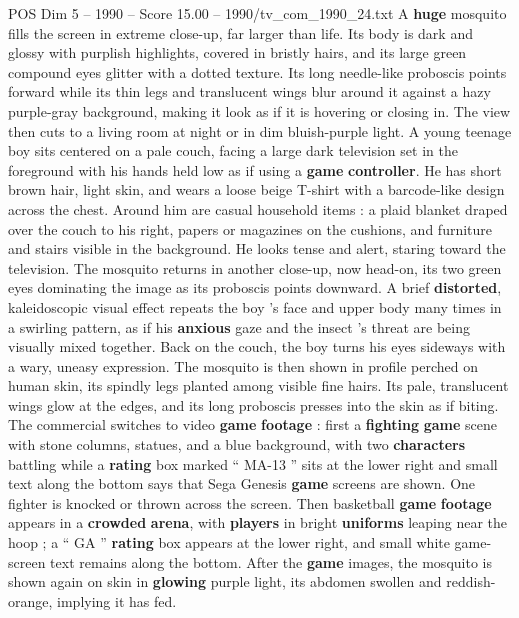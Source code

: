 \begin{textsample}{POS Dim 5 – 1990 – Score 15.00 – 1990/tv\_com\_1990\_24.txt}  \label{ex:f5_pos_005}
A \textbf{huge} mosquito fills the screen in extreme close-up, far larger than life.
Its body is dark and glossy with purplish highlights, covered in bristly hairs, and its large green compound eyes glitter with a dotted texture.
Its long needle-like proboscis points forward while its thin legs and translucent wings blur around it against a hazy purple-gray background, making it look as if it is hovering or closing in.
The view then cuts to a living room at night or in dim bluish-purple light.
A young teenage boy sits centered on a pale couch, facing a large dark television set in the foreground with his hands held low as if using a \textbf{game} \textbf{controller}.
He has short brown hair, light skin, and wears a loose beige T-shirt with a barcode-like design across the chest.
Around him are casual household items : a plaid blanket draped over the couch to his right, papers or magazines on the cushions, and furniture and stairs visible in the background.
He looks tense and alert, staring toward the television.
The mosquito returns in another close-up, now head-on, its two green eyes dominating the image as its proboscis points downward.
A brief \textbf{distorted}, kaleidoscopic visual effect repeats the boy ’s face and upper body many times in a swirling pattern, as if his \textbf{anxious} gaze and the insect ’s threat are being visually mixed together.
Back on the couch, the boy turns his eyes sideways with a wary, uneasy expression.
The mosquito is then shown in profile perched on human skin, its spindly legs planted among visible fine hairs.
Its pale, translucent wings glow at the edges, and its long proboscis presses into the skin as if biting.
The commercial switches to video \textbf{game} \textbf{footage} : first a \textbf{fighting} \textbf{game} scene with stone columns, statues, and a blue background, with two \textbf{characters} battling while a \textbf{rating} box marked “ MA-13 ” sits at the lower right and small text along the bottom says that Sega Genesis \textbf{game} screens are shown.
One fighter is knocked or thrown across the screen.
Then basketball \textbf{game} \textbf{footage} appears in a \textbf{crowded} \textbf{arena}, with \textbf{players} in bright \textbf{uniforms} leaping near the hoop ; a “ GA ” \textbf{rating} box appears at the lower right, and small white game-screen text remains along the bottom.
After the \textbf{game} images, the mosquito is shown again on skin in \textbf{glowing} purple light, its abdomen swollen and reddish-orange, implying it has fed.

\end{textsample}
